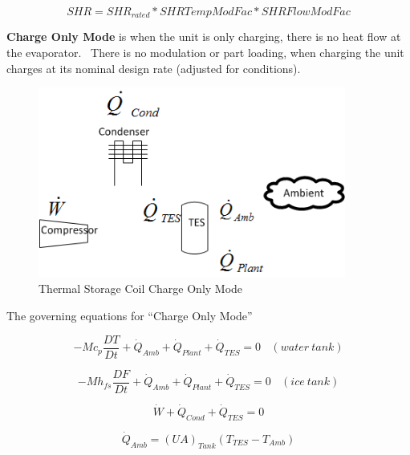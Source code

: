 \begin{equation}
SHR = SH{R_{rated}}*SHRTempModFac*SHRFlowModFac
\end{equation}

\textbf{Charge Only Mode} is when the unit is only charging, there is no heat flow at the evaporator. ~There is no modulation or part loading, when charging the unit charges at its nominal design rate (adjusted for conditions).

\begin{figure}[hbtp] %
\centering
\includegraphics[width=0.9\textwidth, height=0.9\textheight, keepaspectratio=true]{media/image4355.png}
\caption{Thermal Storage Coil Charge Only Mode \protect \label{fig:thermal-storage-coil-charge-only-mode}}
\end{figure}

The governing equations for ``Charge Only Mode''

\begin{equation}
-M{c_p}\frac{{DT}}{{Dt}} + {\dot Q_{Amb}} + {\dot Q_{Plant}} + {\dot Q_{TES}} = 0 ~~~~ (water~tank)
\end{equation}

\begin{equation}
-M{h_{fs}}\frac{{DF}}{{Dt}} + {\dot Q_{Amb}} + {\dot Q_{Plant}} + {\dot Q_{TES}} = 0 ~~~~ (ice~tank)
\end{equation}

\begin{equation}
\dot W + {\dot Q_{Cond}} + {\dot Q_{TES}} = 0
\end{equation}

\begin{equation}
{\dot Q_{Amb}} = {\left( {UA} \right)_{Tank}}\left( {{T_{TES}} - {T_{Amb}}} \right)
\end{equation}


